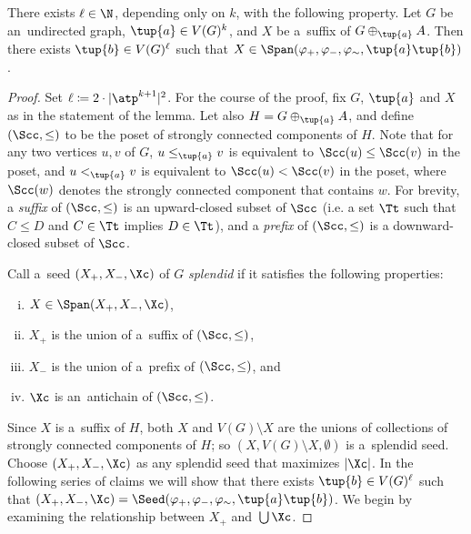 \begin{lemma}
    \label{lem:suffix-to-param}
    There exists $\ell \in \N$, depending only on $k$, with the following property.
    Let $G$ be an~undirected graph, $\tup{a} \in V(G)^k$, and $X$ be a~suffix of $G \oplus_{\tup{a}} A$.
    Then there exists $\tup{b} \in V(G)^\ell$ such that $X \in \Span(\varphi_+, \varphi_-, \varphi_\sim, \tup{a}\tup{b})$.
\end{lemma}
\begin{proof}
    Set $\ell \coloneqq 2 \cdot |\atp^{k+1}|^2$.
    For the course of the proof, fix $G$, $\tup{a}$ and $X$ as in the statement of the lemma.
    Let also $H = G \oplus_{\tup{a}} A$, and define $(\Scc, \leq)$ to be the poset of strongly connected components of $H$.
    Note that for any two vertices $u,v$ of $G$, $u \leq_{\tup{a}} v$ is equivalent to $\Scc(u) \leq \Scc(v)$ in the poset, and $u <_{\tup{a}} v$ is equivalent to $\Scc(u) < \Scc(v)$ in the poset, where $\Scc(w)$ denotes the strongly connected component that contains $w$. For brevity, a {\em{suffix}} of $(\Scc,\leq)$ is an upward-closed subset of $\Scc$ (i.e. a set $\Tt$ such that $C\leq D$ and $C\in \Tt$ implies $D\in \Tt$), and a {\em{prefix}} of $(\Scc,\leq)$ is a downward-closed subset of $\Scc$.

    Call a~seed $(X_+, X_-, \Xc)$ of $G$ \emph{splendid} if it satisfies the following properties:
    \begin{enumerate}[(i), nosep]
        \item $X \in \Span(X_+, X_-, \Xc)$,
        \item \label{item:suffix-to-param-xp-suffix} $X_+$ is the union of a~suffix of $(\Scc, \leq)$,
        \item $X_-$ is the union of a~prefix of $(\Scc, \leq)$, and
        \item \label{item:suffix-to-param-xc-antichain} $\Xc$ is an~antichain of $(\Scc, \leq)$.
    \end{enumerate}
    Since $X$ is a~suffix of $H$, both $X$ and $V(G) \setminus X$ are the unions of collections of strongly connected components of $H$; so $(X, V(G) \setminus X, \emptyset)$ is a~splendid seed.
    Choose $(X_+, X_-, \Xc)$ as any splendid seed that maximizes $|\Xc|$.
    In the following series of claims we will show that there exists $\tup{b} \in V(G)^\ell$ such that $(X_+, X_-, \Xc) = \Seed(\varphi_+, \varphi_-, \varphi_\sim, \tup{a}\tup{b})$.
    We begin by examining the relationship between $X_+$ and~$\bigcup \Xc$.


\end{proof}
